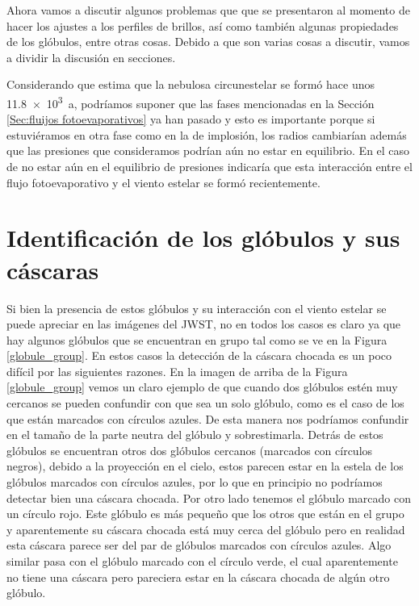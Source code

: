 \documentclass{book}
\begin{document}
Ahora vamos a discutir algunos problemas que que se presentaron al
momento de hacer los ajustes a los perfiles de brillos, así como
también algunas propiedades de los glóbulos, entre otras cosas. Debido
a que son varias cosas a discutir, vamos a dividir la discusión en
secciones.

Considerando que \cite{Zavala:2022} estima que la nebulosa
circunestelar se formó hace unos \SI{11.8e3}{a}, podríamos suponer que
las fases mencionadas en la Sección \ref{Sec:fluijos fotoevaporativos}
ya han pasado y esto es importante porque si estuviéramos en otra fase
como en la de implosión, los radios cambiarían además que las
presiones que consideramos podrían aún no estar en equilibrio. En el
caso de no estar aún en el equilibrio de presiones indicaría que esta
interacción entre el flujo fotoevaporativo y el viento estelar se
formó recientemente.

\section{Identificación de los glóbulos y sus cáscaras}\label{dis:casaras}

Si bien la presencia de estos glóbulos y su interacción con el viento
estelar se puede apreciar en las imágenes del JWST, no en todos los
casos es claro ya que hay algunos glóbulos que se encuentran en grupo
tal como se ve en la Figura \ref{globule_group}. En estos casos la
detección de la cáscara chocada es un poco difícil por las siguientes
razones. En la imagen de arriba de la Figura \ref{globule_group} vemos
un claro ejemplo de que cuando dos glóbulos estén muy cercanos se
pueden confundir con que sea un solo glóbulo, como es el caso de los
que están marcados con círculos azules. De esta manera nos podríamos
confundir en el tamaño de la parte neutra del glóbulo y sobrestimarla.
Detrás de estos glóbulos se encuentran otros dos glóbulos cercanos
(marcados con círculos negros), debido a la proyección en el cielo,
estos parecen estar en la estela de los glóbulos marcados con círculos
azules, por lo que en principio no podríamos detectar bien una cáscara
chocada. Por otro lado tenemos el glóbulo marcado con un círculo rojo.
Este glóbulo es más pequeño que los otros que están en el grupo y
aparentemente su cáscara chocada está muy cerca del glóbulo pero en
realidad esta cáscara parece ser del par de glóbulos marcados con
círculos azules. Algo similar pasa con el glóbulo marcado con el
círculo verde, el cual aparentemente no tiene una cáscara pero
pareciera estar en la cáscara chocada de algún otro glóbulo.
\end{document}
